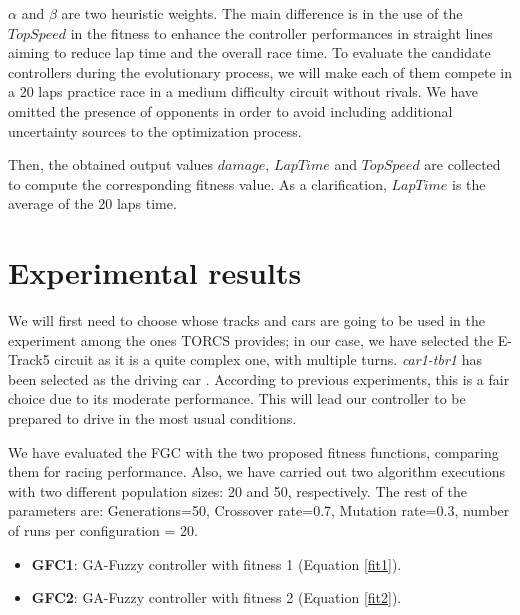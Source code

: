 \documentclass[sigconf]{acmart}
\begin{document}
$\alpha$ and $\beta$ are two heuristic weights. The main difference is
in the use of the $TopSpeed$ in the fitness to enhance the controller performances in straight lines aiming to reduce lap time and the overall race time.
To evaluate the candidate controllers during the evolutionary process, we will make each of them compete in a 20 laps practice race in a medium difficulty circuit without rivals. We have omitted the presence of opponents in order to avoid including additional uncertainty sources to the optimization process.

Then, the obtained output values $damage$, $LapTime$ and $TopSpeed$ are collected to compute the corresponding fitness value. As a clarification, $LapTime$ is the average of the 20 laps time.



\section{Experimental results}  
\label{sec:results}


We will first need to choose whose tracks and cars are going to be used in the
experiment among the ones TORCS provides; in our case, we have selected the E-Track5 circuit as it is a
quite complex one, with multiple turns. \textit{car1-tbr1} has been
selected as the driving car \cite{evo17}. According to previous
experiments, this is a fair choice due to its moderate
performance. This will lead our controller to be prepared to drive in the most usual conditions. 

We have evaluated the FGC with the two proposed fitness functions, %
comparing them for racing performance. Also, we have  carried out two algorithm executions with two different population sizes: 20 and 50, respectively. The rest of the parameters are: Generations=50, Crossover rate=0.7, Mutation rate=0.3, number of runs per configuration = 20.

%	
\begin{itemize}
	\item \textbf{GFC1}: GA-Fuzzy controller with fitness 1 (Equation \ref{fit1}).
	\item \textbf{GFC2}: GA-Fuzzy controller with fitness 2 (Equation \ref{fit2}).
\end{itemize}
\end{document}
